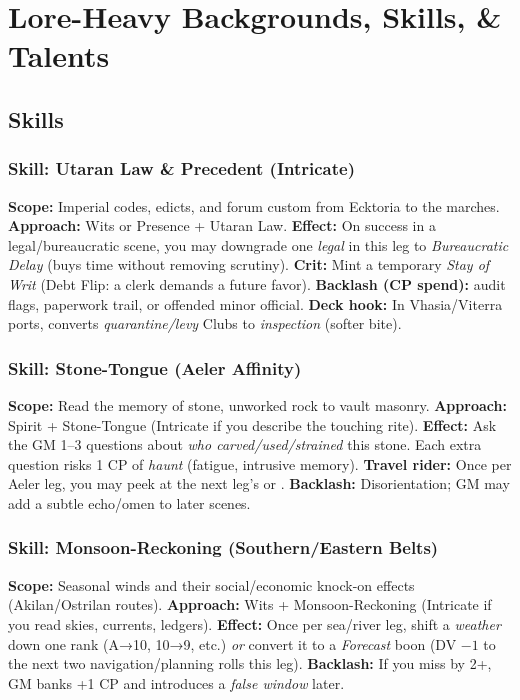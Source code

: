 \chapter{Lore-Heavy Backgrounds, Skills, \& Talents}

\section{Skills}

\subsection{Skill: Utaran Law \& Precedent (Intricate)}
\textbf{Scope:} Imperial codes, edicts, and forum custom from Ecktoria to the marches.
\textbf{Approach:} Wits or Presence + Utaran Law.
\textbf{Effect:} On success in a legal/bureaucratic scene, you may downgrade one \emph{legal} \SuitClub{} in this leg to \emph{Bureaucratic Delay} (buys time without removing scrutiny).
\textbf{Crit:} Mint a temporary \SuitDiamond{} \emph{Stay of Writ} (Debt Flip: a clerk demands a future favor).
\textbf{Backlash (CP spend):} audit flags, paperwork trail, or offended minor official.
\textbf{Deck hook:} In Vhasia/Viterra ports, converts \emph{quarantine/levy} Clubs to \emph{inspection} (softer bite).

\subsection{Skill: Stone-Tongue (Aeler Affinity)}
\textbf{Scope:} Read the memory of stone, unworked rock to vault masonry.
\textbf{Approach:} Spirit + Stone-Tongue (Intricate if you describe the touching rite).
\textbf{Effect:} Ask the GM 1--3 questions about \emph{who carved/used/strained} this stone. Each extra question risks 1 CP of \emph{haunt} (fatigue, intrusive memory).
\textbf{Travel rider:} Once per Aeler leg, you may peek at the next leg's \SuitSpade{} or \SuitClub{}.
\textbf{Backlash:} Disorientation; GM may add a subtle echo/omen to later scenes.

\subsection{Skill: Monsoon-Reckoning (Southern/Eastern Belts)}
\textbf{Scope:} Seasonal winds and their social/economic knock-on effects (Akilan/Ostrilan routes).
\textbf{Approach:} Wits + Monsoon-Reckoning (Intricate if you read skies, currents, ledgers).
\textbf{Effect:} Once per sea/river leg, shift a \emph{weather} \SuitClub{} down one rank (A→10, 10→9, etc.) \emph{or} convert it to a \emph{Forecast} boon (DV $-1$ to the next two navigation/planning rolls this leg).
\textbf{Backlash:} If you miss by 2+, GM banks +1 CP and introduces a \emph{false window} later.

